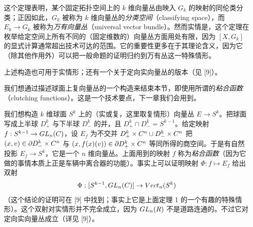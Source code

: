 
这个定理表明，某个固定拓扑空间上的 $k$ 维向量丛由映入 $G_k$ 的映射的同伦类分类；正因如此，$G_k$ 被称为 $k$ 维向量丛的\emph{分类空间}（classifying space），而 $E_k\to G_k$ 被称为\emph{万有向量丛}（universal vector bundle）。然而实情是，这个定理在枚举给定空间上所有不同的（固定维数的）向量丛方面用处有限，因为 $[X,G_k]$ 的显式计算通常超出技术可达的范围。它的重要性更多在于其理论含义，因为它（除其他作用外）可以把一般命题的证明归约到万有丛这一特殊情形。

上述构造也可用于实情形；还有一个关于定向实向量丛的版本（见 [9]）。

我们想通过描述球面上复向量丛的一个构造来结束本节，即使用所谓的\emph{粘合函数}（clutching functions）。这是一个技术要点，下一章我们会用到。

我们想构造 $k$ 维球面 $S^k$ 上的（实或复，这里取复情形）向量丛 $E\to S^k$。把球面写成上半球 $D^k_+$ 与下半球 $D^k_-$ 的并，且 $D^k_+\cap D^k_-=S^{k-1}$。给定映射 $f: S^{k-1}\to GL_n(C)$，设 $E_f$ 为不交并 $D^k_+\times C^n\cup D^k_-\times C^n$ 把 $(x,v)\in\partial D^k_-\times C^n$ 与 $(x,f(x)(v))\in\partial D^k_+\times C^n$ 等同所得的商空间。于是有自然投影 $E_f\to S^k$，它是一个 $n$ 维向量丛。上面用到的映射 $f$ 称为\emph{粘合函数}（因为它做的事情本质上正是车辆中离合器的功能）。事实上可以证明映射 $\Phi: f\mapsto E_f$ 给出双射
\[ \Phi: [S^{k-1},GL_n(C)]\to Vect_n(S^k) \]
（这个结论的证明可在 [9] 中找到；事实上它是上面定理 1 的一个有趣的特殊情形）。这个双射对实情形并不完全成立，因为 $GL_n(R)$ 不是道路连通的。不过它对定向实向量丛成立（详见 [9]）。



